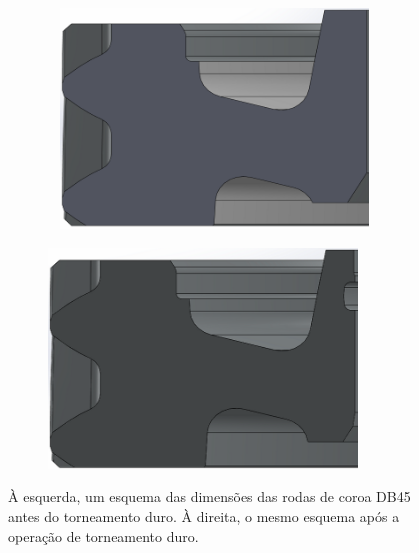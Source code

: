 \begin{figure}[htb]
    \centering
    \begin{subfigure}{.5\textwidth}\
        \centering
        \includegraphics[width = 0.9\textwidth]{Figures/Cap3/DB45_antes_torn.png}
        \caption{}
        \label{fig:Coroa_antes_torneamento}
    \end{subfigure}%
    \begin{subfigure}{.5\textwidth}
        \centering
        \includegraphics[width = 0.9\textwidth]{Figures/Cap3/DB45_apos_torn.png}
        \caption{}
        \label{fig:Coroa_apos_torneamento}
    \end{subfigure}
    \caption[Imagens das rodas de coroa antes e após o torneamento duro]%
    {À esquerda, um esquema das dimensões das rodas de coroa DB45 antes do torneamento duro. À direita, o mesmo esquema após a operação de torneamento duro.}
\end{figure}

